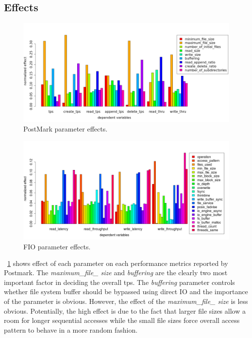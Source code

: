 \subsection{Effects}
\begin{figure}[!t]
\centering
\includegraphics[width=1\textwidth]{figure/pm_effect.png}
\caption{PostMark parameter effects.}
\label{pm_effect}
\end{figure}

\begin{figure}[!t]
\centering
\includegraphics[width=1\textwidth]{figure/fio_effect.png}
\caption{FIO parameter effects.}
\label{fio_effect}
\end{figure}

\figurename~\ref{pm_effect} shows effect of each parameter on each performance metrics reported by Postmark. 
The \emph{maximum\_file\_ size} and \emph{buffering} are the clearly two most important factor in deciding the overall tps. 
The \emph{buffering} parameter controls whether file system buffer should be bypassed using direct IO and the importance of the parameter is obvious. 
However, the effect of the \emph{maximum\_file\_ size} is less obvious. 
Potentially, the high effect is due to the fact that larger file sizes allow a room for longer sequential accesses while the small file sizes force overall access pattern to behave in a more random fashion. 

